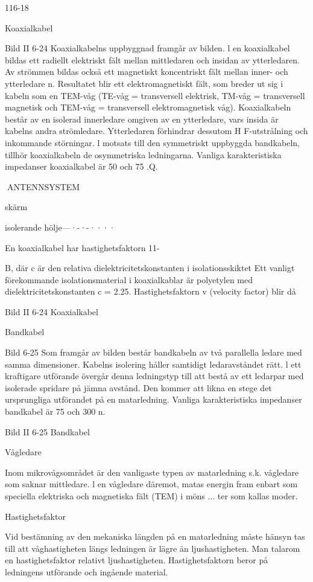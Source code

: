 \documentclass[a4paper,twoside,twocolumn,openright]{book}
\begin{document}
{{{116-18

Koaxialkabel

Bild II 6-24
Koaxialkabelns uppbyggnad framgår av bilden. l en koaxialkabel bildas ett radiellt
elektriskt fält mellan mittledaren och insidan
av ytterledaren. Av strömmen bildas också
ett magnetiskt koncentriskt fält mellan inner- och ytterledare n. Resultatet blir ett elektromagnetiskt fält, som breder ut sig i kabeln
som en TEM-våg (TE-våg = transversell
elektrisk, TM-våg = transversell magnetisk
och TEM-våg = transversell elektromagnetisk våg).
Koaxialkabeln består av en isolerad innerledare omgiven av en ytterledare, vars insida är kabelns andra strömledare. Ytterledaren förhindrar dessutom H F-utstrålning
och inkommande störningar. l motsats till
den symmetriskt uppbyggda bandkabeln,
tillhör koaxialkabeln de osymmetriska ledningarna.
Vanliga karakteristiska impedanser
koaxialkabel är 50 och 75 .Q.

ANTENNSYSTEM

skärm

isolerande hölje---·-·-····

En koaxialkabel har hastighetsfaktorn
11-{B, där c är den relativa dielektricitetskonstanten i isolationsskiktet Ett vanligt förekommande isolationsmaterial i koaxialkablar är polyetylen med dielektricitetskonstanten c = 2.25.
Hastighetsfaktorn v (velocity factor) blir
då

Bild II 6-24 Koaxialkabel

Bandkabel

Bild 6-25
Som framgår av bilden består bandkabeln
av två parallella ledare med samma dimensioner. Kabelns isolering håller samtidigt
ledaravståndet rätt. l ett kraftigare utförande
övergår denna ledningstyp till att bestå av
ett ledarpar med isolerade spridare på jämna
avstånd. Den kommer att likna en stege det ursprungliga utförandet på en matarledning.
Vanliga karakteristiska impedanser
bandkabel är 75 och 300 n.

Bild II 6-25 Bandkabel

Vågledare

Inom mikrovågsområdet är den vanligaste
typen av matarledning s.k. vågledare som
saknar mittledare. l en vågledare däremot,
matas energin fram enbart som speciella
elektriska och magnetiska fält (TEM) i möns ...
ter som kallas moder.

Hastighetsfaktor

Vid bestämning av den mekaniska längden
på en matarledning måste hänsyn tas till att
våghastigheten längs ledningen är lägre än
ljushastigheten. Man talarom en hastighetsfaktor relativt ljushastigheten. Hastighetsfaktorn beror på ledningens utförande och
ingående material.

}}}}
\end{document}
